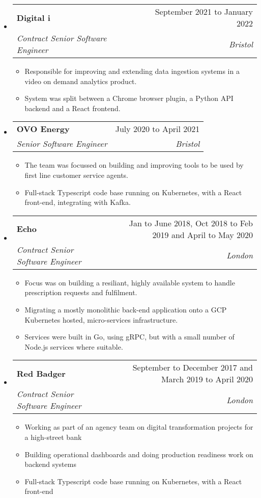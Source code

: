 \documentclass[letterpaper,12pt]{article}[leftmargin=*]
\makeatletter
\def \entryspacing {-0pt}
\newenvironment{resumeEntry}[0]{
  \begin{itemize}[leftmargin=2.5mm]
  }{
  \end{itemize}\vspace{\entryspacing}
}
\newenvironment{resumeItemList}[0]{
  \begin{itemize}[leftmargin=4.5mm]
  }{
  \end{itemize}
}
\newcommand{\resumeItem}[1]{
  \item\small{
    {#1 \vspace{-2pt}}
  }
}
\newcommand{\resumeEntryTSDL}[4]{
  \vspace{-1pt}\item[]
    \begin{tabularx}{0.97\textwidth}{X@{\hspace{60pt}}r}
      \textbf{\color{primary}#1} & {\firabook\color{accent}\small#2} \\
      \textit{\color{accent}\small#3} & \textit{\color{accent}\small#4} \\
    \end{tabularx}\vspace{-6pt}
}
\makeatother
\begin{document}
  \begin{resumeEntry}
    \resumeEntryTSDL{Digital i}{September 2021 to January 2022}
      {Contract Senior Software Engineer}{Bristol}
    \begin{resumeItemList}
      \resumeItem{Responsible for improving and extending data ingestion systems in a video on demand analytics product.}
      \resumeItem{System was split between a Chrome browser plugin, a Python API backend and a React frontend.}
    \end{resumeItemList}
  \end{resumeEntry}

  \begin{resumeEntry}
    \resumeEntryTSDL{OVO Energy}{July 2020 to April 2021}
      {Senior Software Engineer}{Bristol}
    \begin{resumeItemList}
      \resumeItem{The team was focussed on building and improving tools to be used by first line customer service agents.}
      \resumeItem{Full-stack Typescript code base running on Kubernetes, with a React front-end, integrating with Kafka.}
    \end{resumeItemList}
  \end{resumeEntry}

  \begin{resumeEntry}
    \resumeEntryTSDL{Echo}{Jan to June 2018, Oct 2018 to Feb 2019 and April to May 2020}
      {Contract Senior Software Engineer}{London}
    \begin{resumeItemList}
      \resumeItem{Focus was on building a resiliant, highly available system to handle prescription requests and fulfilment.}
      \resumeItem{Migrating a mostly monolithic back-end application onto a GCP Kubernetes hosted, micro-services infrastructure.}
      \resumeItem{Services were built in Go, using gRPC, but with a small number of Node.js services where suitable.}
    \end{resumeItemList}
  \end{resumeEntry}

  \begin{resumeEntry}
    \resumeEntryTSDL{Red Badger}{September to December 2017 and March 2019 to April 2020}
      {Contract Senior Software Engineer}{London}
    \begin{resumeItemList}
      \resumeItem{Working as part of an agency team on digital transformation projects for a high-street bank}
      \resumeItem{Building operational dashboards and doing production readiness work on backend systems}
      \resumeItem{Full-stack Typescript code base running on Kubernetes, with a React front-end}
    \end{resumeItemList}
  \end{resumeEntry}
\end{document}
